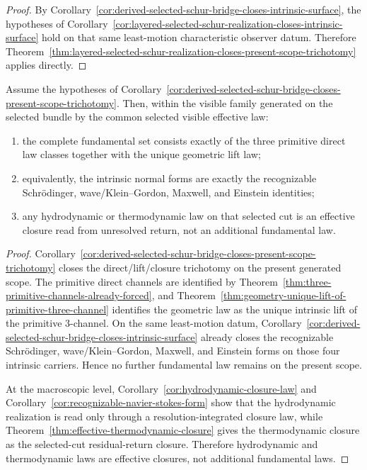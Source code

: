\begin{proof}
By
Corollary~\ref{cor:derived-selected-schur-bridge-closes-intrinsic-surface},
the hypotheses of
Corollary~\ref{cor:layered-selected-schur-realization-closes-intrinsic-surface}
hold on that same least-motion characteristic observer datum. Therefore
Theorem~\ref{thm:layered-selected-schur-realization-closes-present-scope-trichotomy}
applies directly.
\end{proof}

\begin{theorem}
\label{thm:present-scope-complete-fundamental-set}
Assume the hypotheses of
Corollary~\ref{cor:derived-selected-schur-bridge-closes-present-scope-trichotomy}.
Then, within the visible family generated on the selected bundle by the common
selected visible effective law:
\begin{enumerate}[label=(\roman*), leftmargin=2em, itemsep=0.2em]
\item the complete fundamental set consists exactly of the three primitive
      direct law classes together with the unique geometric lift law;
\item equivalently, the intrinsic normal forms are exactly the recognizable
      Schr\"odinger, wave/Klein--Gordon, Maxwell, and Einstein identities;
\item any hydrodynamic or thermodynamic law on that selected cut is an
      effective closure read from unresolved return, not an additional
      fundamental law.
\end{enumerate}
\end{theorem}

\begin{proof}
Corollary~\ref{cor:derived-selected-schur-bridge-closes-present-scope-trichotomy}
closes the direct/lift/closure trichotomy on the present generated
scope. The primitive direct channels are identified by
Theorem~\ref{thm:three-primitive-channels-already-forced}, and
Theorem~\ref{thm:geometry-unique-lift-of-primitive-three-channel} identifies
the geometric law as the unique intrinsic lift of the primitive
\(3\)-channel. On the same least-motion datum,
Corollary~\ref{cor:derived-selected-schur-bridge-closes-intrinsic-surface}
already closes the recognizable Schr\"odinger, wave/Klein--Gordon, Maxwell,
and Einstein forms on those four intrinsic carriers. Hence no further
fundamental law remains on the present scope.

At the macroscopic level,
Corollary~\ref{cor:hydrodynamic-closure-law} and
Corollary~\ref{cor:recognizable-navier-stokes-form} show that the
hydrodynamic realization is read only through a resolution-integrated closure law,
while Theorem~\ref{thm:effective-thermodynamic-closure} gives the
thermodynamic closure as the selected-cut residual-return closure. Therefore
hydrodynamic and thermodynamic laws are effective closures, not additional
fundamental laws.
\end{proof}

